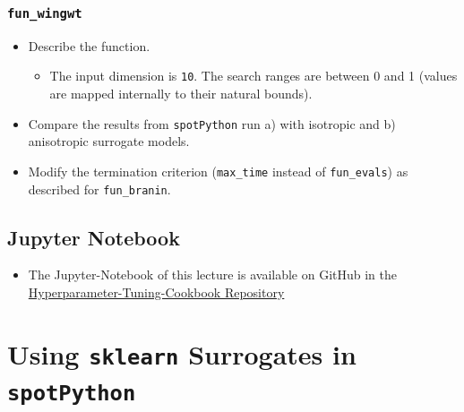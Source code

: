 \documentclass[
  letterpaper,
  DIV=11,
  numbers=noendperiod]{scrreprt}
\providecommand{\tightlist}{%
  \setlength{\itemsep}{0pt}\setlength{\parskip}{0pt}}\usepackage{longtable,booktabs,array}
\begin{document}
\subsection{\texorpdfstring{\texttt{fun\_wingwt}}{fun\_wingwt}}\label{fun_wingwt}

\begin{itemize}
\tightlist
\item
  Describe the function.

  \begin{itemize}
  \tightlist
  \item
    The input dimension is \texttt{10}. The search ranges are between 0
    and 1 (values are mapped internally to their natural bounds).
  \end{itemize}
\item
  Compare the results from \texttt{spotPython} run a) with isotropic and
  b) anisotropic surrogate models.
\item
  Modify the termination criterion (\texttt{max\_time} instead of
  \texttt{fun\_evals}) as described for \texttt{fun\_branin}.
\end{itemize}

\section{Jupyter Notebook}\label{jupyter-notebook-8}

\begin{tcolorbox}[enhanced jigsaw, left=2mm, opacitybacktitle=0.6, leftrule=.75mm, toptitle=1mm, opacityback=0, colback=white, rightrule=.15mm, colframe=quarto-callout-note-color-frame, title=\textcolor{quarto-callout-note-color}{\faInfo}\hspace{0.5em}{Note}, toprule=.15mm, coltitle=black, bottomrule=.15mm, bottomtitle=1mm, colbacktitle=quarto-callout-note-color!10!white, titlerule=0mm, breakable, arc=.35mm]

\begin{itemize}
\tightlist
\item
  The Jupyter-Notebook of this lecture is available on GitHub in the
  \href{https://github.com/sequential-parameter-optimization/Hyperparameter-Tuning-Cookbook/blob/main/009_num_spot_anisotropic.ipynb}{Hyperparameter-Tuning-Cookbook
  Repository}
\end{itemize}

\end{tcolorbox}

\chapter{\texorpdfstring{Using \texttt{sklearn} Surrogates in
\texttt{spotPython}}{Using sklearn Surrogates in spotPython}}\label{sec-sklearn-surrogates}
\end{document}

